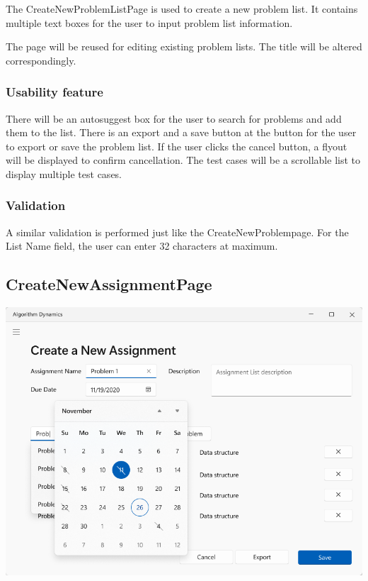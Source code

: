 \documentclass[a4paper]{report}
\begin{document}
The CreateNewProblemListPage is used to create a new problem list. It contains multiple text boxes for the user to input problem list information.

The page will be reused for editing existing problem lists. The title will be altered correspondingly.

\subsubsection{Usability feature}

There will be an autosuggest box for the user to search for problems and add them to the list. There is an export and a save button at the button for the user to export or save the problem list. If the user clicks the cancel button, a flyout will be displayed to confirm cancellation. The test cases will be a scrollable list to display multiple test cases.

\subsubsection{Validation}

A similar validation is performed just like the CreateNewProblempage. For the List Name field, the user can enter 32 characters at maximum.

\subsection{CreateNewAssignmentPage}

\includegraphics[width=\textwidth, height=\textheight, keepaspectratio]{CreateNewAssignmentPage-design}
\end{document}
